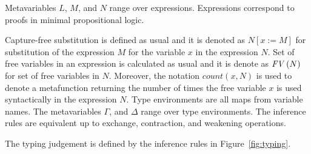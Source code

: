 \documentclass[a4paper]{article}
\newcommand{\sbs}[3]{#1[#2:=#3]}
\newcommand{\fv}[1]{\txt{FV}\,(#1)}
\newcommand{\txt}[1]{\text{\textit{#1}}}
\begin{document}
Metavariables $L$, $M$, and $N$ range over expressions. Expressions
correspond to proofs in minimal propositional logic.


Capture-free substitution is defined as usual and it is denoted as
$\sbs{N}{x}{M}$ for substitution of the expression $M$ for the variable
$x$ in the expression $N$. Set of free variables in an expression is
calculated as usual and it is denote as $\fv{N}$ for set of free
variables in $N$. Moreover, the notation $count(x,N)$ is used to denote a
metafunction returning the number of times the free variable $x$ is
used syntactically in the expression $N$.
Type %
 environments are all maps from
variable names. The metavariables $\Gamma$, and $\Delta$ range over
type environments.  The inference rules are equivalent up to exchange,
contraction, and weakening operations. 

The typing judgement is defined by the inference rules in
Figure~\ref{fig:typing}.
\end{document}

